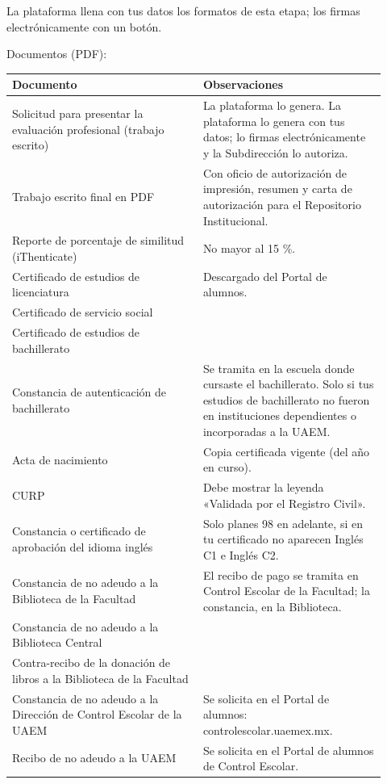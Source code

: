 La plataforma llena con tus datos los formatos de esta etapa; los firmas electrónicamente con un botón.

Documentos (PDF):
{\small\begin{longtable}{>{\raggedright\arraybackslash}p{0.47\linewidth}>{\raggedright\arraybackslash}p{0.45\linewidth}}
\toprule
\textbf{Documento} & \textbf{Observaciones}\\
\midrule
\endhead
Solicitud para presentar la evaluación profesional (trabajo escrito) & La plataforma lo genera. La plataforma lo genera con tus datos; lo firmas electrónicamente y la Subdirección lo autoriza.\\
Trabajo escrito final en PDF & Con oficio de autorización de impresión, resumen y carta de autorización para el Repositorio Institucional.\\
Reporte de porcentaje de similitud (iThenticate) & No mayor al 15 \%.\\
Certificado de estudios de licenciatura & Descargado del Portal de alumnos.\\
Certificado de servicio social & \\
Certificado de estudios de bachillerato & \\
Constancia de autenticación de bachillerato & Se tramita en la escuela donde cursaste el bachillerato. Solo si tus estudios de bachillerato no fueron en instituciones dependientes o incorporadas a la UAEM.\\
Acta de nacimiento & Copia certificada vigente (del año en curso).\\
CURP & Debe mostrar la leyenda «Validada por el Registro Civil».\\
Constancia o certificado de aprobación del idioma inglés & Solo planes 98 en adelante, si en tu certificado no aparecen Inglés C1 e Inglés C2.\\
Constancia de no adeudo a la Biblioteca de la Facultad & El recibo de pago se tramita en Control Escolar de la Facultad; la constancia, en la Biblioteca.\\
Constancia de no adeudo a la Biblioteca Central & \\
Contra-recibo de la donación de libros a la Biblioteca de la Facultad & \\
Constancia de no adeudo a la Dirección de Control Escolar de la UAEM & Se solicita en el Portal de alumnos: controlescolar.uaemex.mx.\\
Recibo de no adeudo a la UAEM & Se solicita en el Portal de alumnos de Control Escolar.\\

\end{longtable}}
